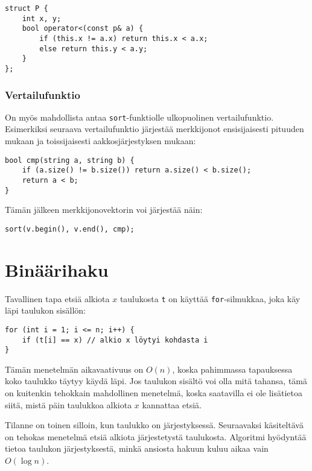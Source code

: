\begin{lstlisting}
struct P {
    int x, y;
    bool operator<(const p& a) {
        if (this.x != a.x) return this.x < a.x;
        else return this.y < a.y;
    }
};
\end{lstlisting}

\subsubsection{Vertailufunktio}

On myös mahdollista antaa
\texttt{sort}-funktiolle ulkopuolinen vertailufunktio.
Esimerkiksi seuraava vertailufunktio
järjestää merkkijonot ensisijaisesti pituuden mukaan
ja toissijaisesti aakkosjärjestyksen mukaan:

\begin{lstlisting}
bool cmp(string a, string b) {
    if (a.size() != b.size()) return a.size() < b.size();
    return a < b;
}
\end{lstlisting}

Tämän jälkeen merkkijonovektorin voi järjestää näin:

\begin{lstlisting}
sort(v.begin(), v.end(), cmp);
\end{lstlisting}

\section{Binäärihaku}


Tavallinen tapa etsiä alkiota $x$ taulukosta \texttt{t}
on käyttää \texttt{for}-silmukkaa, joka käy läpi
taulukon sisällön:

\begin{lstlisting}
for (int i = 1; i <= n; i++) {
    if (t[i] == x) // alkio x löytyi kohdasta i
}
\end{lstlisting}

Tämän menetelmän aikavaativuus on $O(n)$,
koska pahimmassa tapauksessa koko taulukko täytyy
käydä läpi.
Jos taulukon sisältö voi olla mitä tahansa,
tämä on kuitenkin tehokkain mahdollinen menetelmä,
koska saatavilla ei ole lisätietoa siitä,
mistä päin taulukkoa alkiota $x$ kannattaa etsiä.

Tilanne on toinen silloin, kun taulukko on
järjestyksessä.
Seuraavaksi käsiteltävä 
on tehokas menetelmä
etsiä alkiota järjestetystä taulukosta.
Algoritmi hyödyntää tietoa taulukon
järjestyksestä,
minkä ansiosta hakuun kuluu aikaa vain $O(\log n)$.

